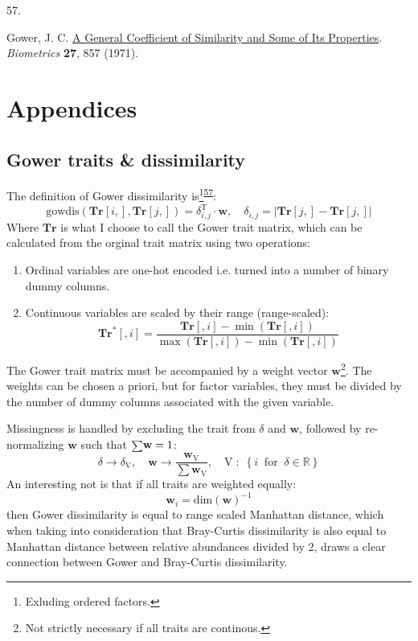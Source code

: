 \documentclass[
  10pt,
]{article}
\newlength{\cslhangindent}
\newlength{\csllabelwidth}
\newlength{\cslentryspacingunit} %
\newenvironment{CSLReferences}[2] %
 {%
  \setlength{\parindent}{0pt}
  \ifodd #1
  \let\oldpar\par
  \def\par{\hangindent=\cslhangindent\oldpar}
  \fi
  \setlength{\parskip}{#2\cslentryspacingunit}
 }%
 {}
\newcommand{\CSLLeftMargin}[1]{\parbox[t]{\csllabelwidth}{#1}}
\newcommand{\CSLRightInline}[1]{\parbox[t]{\linewidth - \csllabelwidth}{#1}\break}
\begin{document}
\begin{CSLReferences}{0}{0}
\leavevmode{}%
\CSLLeftMargin{57. }
\CSLRightInline{Gower, J. C. \href{https://doi.org/10.2307/2528823}{{A General Coefficient of Similarity and Some of Its Properties}}. \emph{Biometrics} \textbf{27}, 857 (1971).}

\end{CSLReferences}

\newpage
\appendix
\section*{Appendices}
\renewcommand{\thesubsection}{\Alph{subsection}}

\hypertarget{appendixGower}{%
\subsection{Gower traits \& dissimilarity}\label{appendixGower}}

The definition of Gower dissimilarity is\footnote{Exluding ordered factors.}\textsuperscript{\protect\hyperlink{ref-Gower1971}{57}}:
\[\mathrm{gowdis}(\mathbf{Tr}[i,],\mathbf{Tr}[j,])=\delta_{i,j}^\mathrm{T} \cdot \mathbf{w},\quad \delta_{i,j} = \left\lvert\mathbf{Tr}[j,]-\mathbf{Tr}[j,]\right\rvert\]
Where \(\mathbf{Tr}\) is what I choose to call the Gower trait matrix, which can be calculated from the orginal trait matrix using two operations:

\begin{enumerate}
  \item Ordinal variables are one-hot encoded i.e. turned into a number of binary dummy columns.
  \item Continuous variables are scaled by their range (range-scaled):
$$\mathbf{Tr}^*[,i]=\frac{\mathbf{Tr}[,i]-\min{\left(\mathbf{Tr}[,i]\right)}}{\max{\left(\mathbf{Tr}[,i]\right)}-\min{\left(\mathbf{Tr}[,i]\right)}}$$
\end{enumerate}

The Gower trait matrix must be accompanied by a weight vector \(\mathbf{w}\)\footnote{Not strictly necessary if all traits are continous.}. The weights can be chosen a priori, but for factor variables, they must be divided by the number of dummy columns associated with the given
variable.

Missingness is handled by excluding the trait from \(\delta\) and
\(\mathbf{w}\), followed by re-normalizing \(\mathbf{w}\) such that
\(\mathsmaller\sum\mathbf{w}=1\):
\[\delta\rightarrow\delta_\mathrm{V}, \quad  \mathbf{w} \rightarrow \frac{\mathbf{w}_\mathrm{V}}{\sum\mathbf{w}_\mathrm{V}}, \quad \mathrm{V}\;:\;\left\{i \;\; \mathrm{for} \;\;  \delta\in\mathbb{R}\right\}\]
An interesting not is that if all traits are weighted equally: \[\mathbf{w}_i=\mathrm{dim}(\mathbf{w})^{-1}\] then Gower dissimilarity is equal to range scaled Manhattan distance, which when taking into consideration that Bray-Curtis dissimilarity is also equal to Manhattan distance between relative abundances divided by 2, draws a clear connection between Gower and Bray-Curtis dissimilarity.
\end{document}
